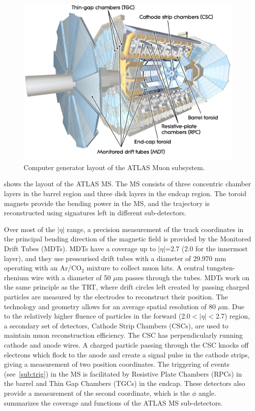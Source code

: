 \begin{figure}[!ht]
    \centering
    \includegraphics[width=0.7\linewidth]{figures/experiment/MuonSystem.png}
    \caption{Computer generator layout of the ATLAS Muon subsystem.~\cite{Pequenao:1095929}}
    \label{fig:ms}
\end{figure}

 shows the layout of the ATLAS MS. The MS consists of three concentric chamber layers in the barrel region and three disk layers in the endcap region. The toroid magnets provide the bending power in the MS, and the trajectory is reconstructed using signatures left in different sub-detectors. 

Over most of the $|\eta|$ range, a precision measurement of the track coordinates in the principal bending direction of the magnetic field is provided by the Monitored Drift Tubes (MDTs). MDTs have a coverage up to $|\eta|$=2.7 (2.0 for the innermost layer), and they use pressurised drift tubes with a diameter of 29.970 mm operating with an Ar/CO$_2$ mixture to collect muon hits. A central tungsten-rhenium wire with a diameter of 50 $\mu$m passes through the tubes. MDTs work on the same principle as the TRT, where drift circles left created by passing charged particles are measured by the electrodes to reconstruct their position. The technology and geometry allows for an average spatial resolution of 80 $\mu$m. Due to the relatively higher fluence of particles in the forward (2.0$<|\eta|<$2.7) region, a secondary set of detectors, Cathode Strip Chambers (CSCs), are used to maintain muon reconstruction efficiency. The CSC has perpendicularly running cathode and anode wires. A charged particle passing through the CSC knocks off electrons which flock to the anode and create a signal pulse in the cathode strips, giving a measurement of two position coordinates. The triggering of events (see~\cref{sub:trig}) in the MS is facilitated by Resistive Plate Chambers (RPCs) in the barrel and Thin Gap Chambers (TGCs) in the endcap. These detectors also provide a measurement of the second coordinate, which is the $\phi$ angle.~ summarizes the coverage and functions of the ATLAS MS sub-detectors.

